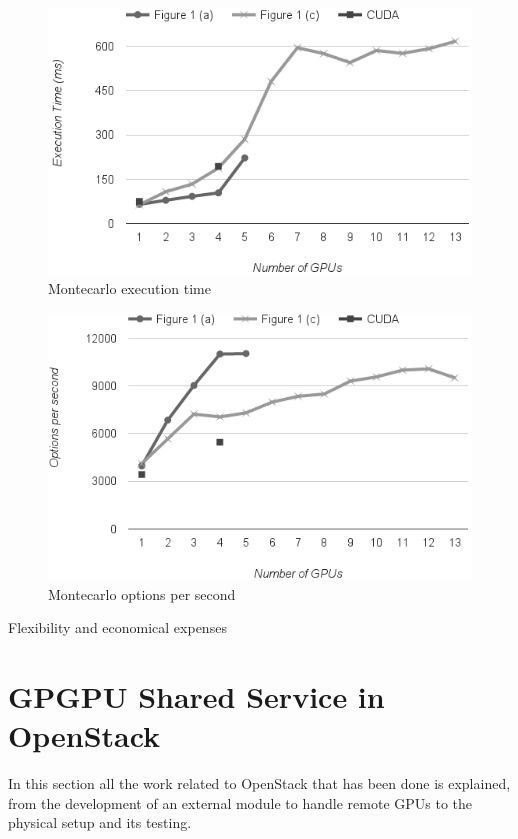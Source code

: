 \documentclass[a4paper,twoside]{article}
\begin{document}
\begin{figure}[!t]
  \centering
  \includegraphics[width=\linewidth]{images/aws-mont2.png}
  \caption{Montecarlo execution time}
  \label{fig:internal}
\end{figure}
\begin{figure}[!t]
  \centering
  \includegraphics[width=\linewidth]{images/aws-mont1.png}
  \caption{Montecarlo options per second}
  \label{fig:internal}
\end{figure}

Flexibility and economical expenses

\section{GPGPU Shared Service in OpenStack}
In this section all the work related to OpenStack that has been done is explained, from the development of an external module to handle remote GPUs to the physical setup and its testing.
\end{document}

